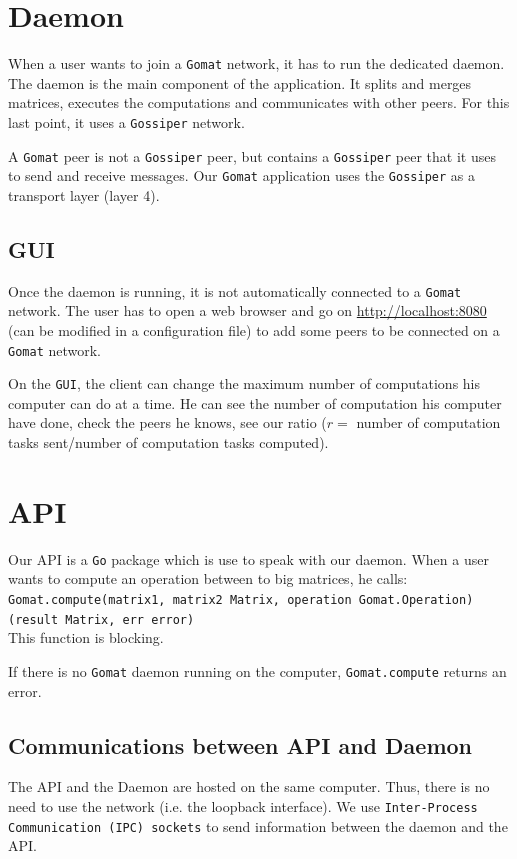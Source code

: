 \documentclass[a4paper,12pt]{article}
\newcommand{\Gossiper}{\texttt{Gossiper}\xspace}
\newcommand{\Gomat}{\texttt{Gomat}\xspace}
\newcommand{\Go}{\texttt{Go}\xspace}
\begin{document}
    \section{Daemon}
    When a user wants to join a \Gomat network, it has to run the dedicated daemon. The daemon is the main component of the
    application. It splits and merges matrices, executes the computations and communicates with other peers. For this last
    point, it uses a \Gossiper network.   
    
    A \Gomat peer is not a \Gossiper peer, but contains a \Gossiper peer that it uses to send and receive messages. Our \Gomat application uses the \Gossiper as a transport layer (layer 4).

    \subsection{GUI}
    Once the daemon is running, it is not automatically connected to a \Gomat network. The user has to open a web
    browser and go on \url{http://localhost:8080} (can be modified in a configuration file) to add some peers to be connected on a
    \Gomat network.
    
    On the \texttt{GUI}, the client can change the maximum number of computations his computer can do at a time. He can see
    the number of computation his computer have done, check the peers he knows, see our ratio
    ($r =$ number of computation tasks sent/{number of computation tasks computed}).

    \section{API}
    Our API is a \Go package which is use to speak with our daemon. When a user wants to compute an operation
    between to big matrices, he calls:\\
    \texttt{Gomat.compute(matrix1, matrix2 Matrix, operation Gomat.Operation)(result Matrix, err error)}\\
    This function is blocking.

    If there is no \Gomat daemon running on the computer, \texttt{Gomat.compute} returns an error.
    \subsection{Communications between API and Daemon}
    The API and the Daemon are hosted on the same computer. Thus, there is no need to use the network (i.e. the loopback interface).
    We use \texttt{Inter-Process Communication (IPC) sockets} to send information between the daemon and the API.
    
\end{document}
